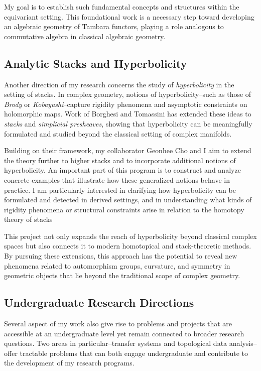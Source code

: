 \documentclass[11pt]{article}
\begin{document}
My goal is to establish such fundamental concepts and structures within the equivariant setting.
This foundational work is a necessary step toward developing an algebraic geometry of Tambara functors, playing a role analogous to commutative algebra in classical algebraic geometry.


\subsection*{Analytic Stacks and Hyperbolicity}
Another direction of my research concerns the study of {\it hyperbolicity} in the setting of stacks.
In complex geometry, notions of hyperbolicity--such as those of {\it Brody} or {\it Kobayashi}--capture rigidity phenomena and asymptotic constraints on holomorphic maps.
Work of Borghesi and Tomassini \cite{MR3673667} has extended these ideas to {\it stacks} and {\it simplicial presheaves}, showing that hyperbolicity can be meaningfully formulated and studied beyond the classical setting of complex manifolds.

Building on their framework, my collaborator Geonhee Cho and I aim to extend the theory further to higher stacks and to incorporate additional notions of hyperbolicity.
An important part of this program is to construct and analyze concrete examples that illustrate how these generalized notions behave in practice.
I am particularly interested in clarifying how hyperbolicity can be formulated and detected in derived settings, and in understanding what kinds of rigidity phenomena or structural constraints arise in relation to the homotopy theory of stacks

This project not only expands the reach of hyperbolicity beyond classical complex spaces but also connects it to modern homotopical and stack-theoretic methods. By pursuing these extensions, this approach has the potential to reveal new phenomena related to automorphism groups, curvature, and symmetry in geometric objects that lie beyond the traditional scope of complex geometry.


\subsection*{Undergraduate Research Directions}
Several aspect of my work also give rise to problems and projects that are accessible at an undergraduate level yet remain connected to broader research questions.
Two areas in particular--transfer systems and topological data analysis--offer tractable problems that can both engage undergraduate and contribute to the development of my research programs.
\end{document}
